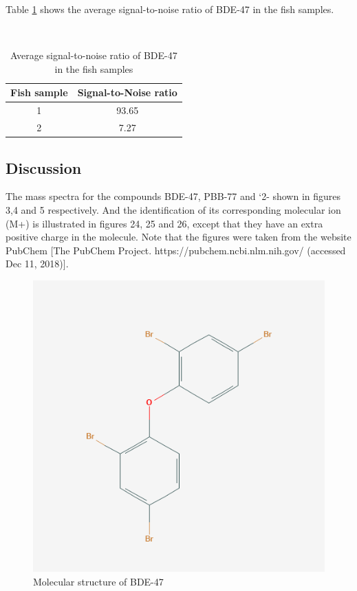 \documentclass[a4paper, 12pt]{article}
\begin{document}
Table \ref{tab-sn} shows the average signal-to-noise ratio of BDE-47 in the fish samples.

\begin{table}[h!]
	\centering
	\caption{Average signal-to-noise ratio of BDE-47 in the fish samples}
	\hfill \\
	\begin{tabular}{|c|c|}
		\hline
		Fish sample & Signal-to-Noise ratio    \\ \hline
		1           & 93.65                    \\ \hline
		2           & 7.27                     \\ \hline
	\end{tabular}
	\label{tab-sn}
\end{table}



\subsection{Discussion}
\setcounter{figure}{23}
The mass spectra for the compounds BDE-47, PBB-77 and `2- shown in figures 3,4 and 5 respectively. And the identification of its corresponding molecular ion (M+) is illustrated in figures 24, 25 and 26, except that they have an extra positive charge in the molecule. Note that the figures were taken from the website PubChem [The PubChem Project. https://pubchem.ncbi.nlm.nih.gov/ (accessed Dec 11, 2018)].

\begin{figure}[h!]
	\centering
	\includegraphics[width=1\textwidth]{bde-47.png}
	\caption{Molecular structure of BDE-47}
	\label{fig-bde}
\end{figure}
\end{document}
